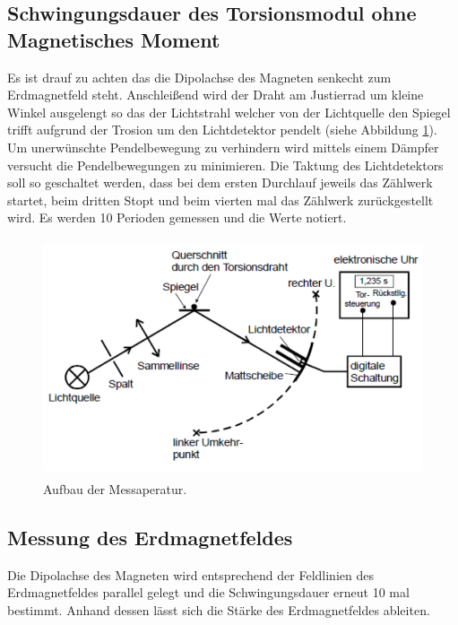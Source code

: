 \subsection{Schwingungsdauer des Torsionsmodul ohne Magnetisches Moment}
Es ist drauf zu achten das die Dipolachse des Magneten senkecht zum Erdmagnetfeld steht. Anschleißend wird der Draht am Justierrad um kleine Winkel ausgelengt so das der Lichtstrahl welcher von der Lichtquelle den Spiegel trifft aufgrund der Trosion um den Lichtdetektor pendelt (siehe Abbildung \ref{fig:Aufbau}). Um unerwünschte Pendelbewegung zu verhindern wird mittels einem Dämpfer versucht die Pendelbewegungen zu minimieren. Die Taktung des Lichtdetektors soll so geschaltet werden, dass bei dem ersten Durchlauf jeweils das Zählwerk startet, beim dritten Stopt und beim vierten mal das Zählwerk zurückgestellt wird. Es werden 10 Perioden gemessen und die Werte notiert.
\begin{figure}
  \centering
  \includegraphics[height=7cm]{picture/Aufbau.png}
  \caption{Aufbau der Messaperatur.}
  \label{fig:Aufbau}
\end{figure}
\subsection{Messung des Erdmagnetfeldes}
Die Dipolachse des Magneten wird entsprechend der Feldlinien des Erdmagnetfeldes parallel gelegt und die Schwingungsdauer erneut 10 mal bestimmt. Anhand dessen lässt sich die Stärke des Erdmagnetfeldes ableiten.
